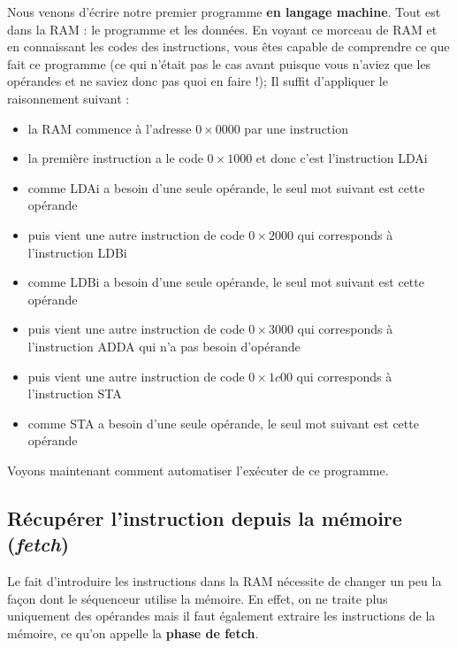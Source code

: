 Nous venons d'écrire notre premier programme \textbf{en langage machine}. Tout est dans la RAM : le programme et les données. En voyant ce morceau de RAM et en connaissant les codes des instructions, vous êtes capable de comprendre ce que fait ce programme (ce qui n'était pas le cas avant puisque vous n'aviez que les opérandes et ne saviez donc pas quoi en faire !); Il suffit d'appliquer le raisonnement suivant :
\begin{itemize}
\item la RAM commence à l'adresse $0\times0000$ par une instruction
\item la première instruction a le code $0\times1000$ et donc c'est l'instruction LDAi
\item comme LDAi a besoin d'une seule opérande, le seul mot suivant est cette opérande
\item puis vient une autre instruction de code $0\times2000$ qui corresponds à l'instruction LDBi
\item comme LDBi a besoin d'une seule opérande, le seul mot suivant est cette opérande
\item puis vient une autre instruction de code $0\times3000$ qui corresponds à l'instruction ADDA qui n'a pas besoin d'opérande
\item puis vient une autre instruction de code $0\times1c00$ qui corresponds à l'instruction STA
\item comme STA a besoin d'une seule opérande, le seul mot suivant est cette opérande
\end{itemize}
 Voyons maintenant comment automatiser l'exécuter de ce programme. 

\subsection{Récupérer l'instruction depuis la mémoire (\emph{fetch})}

Le fait d'introduire les instructions dans la RAM nécessite de changer un peu la façon dont le séquenceur utilise la mémoire. En effet, on ne traite plus uniquement des opérandes mais il faut également extraire les instructions de la mémoire, ce qu'on appelle la \textbf{phase de fetch}. 

